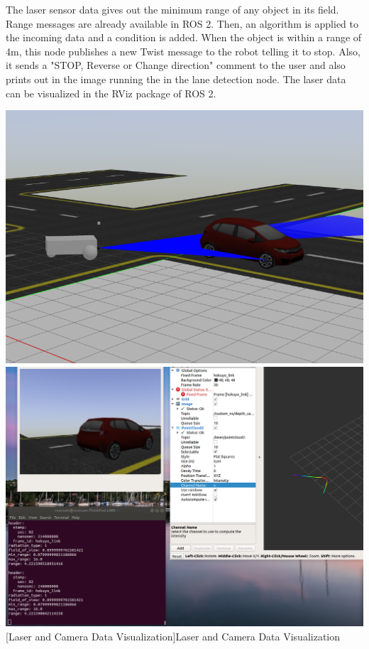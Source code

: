 \documentclass[%
xelatex,
	oneside,		%
	12pt,			%
	parskip=half,	%
	abstracton,
	chapterprefix=true%
    appendixprefix=true]
{scrbook}
\begin{document}
The laser sensor data gives out the minimum range of any object in its field. Range messages are already available in ROS 2. Then, an algorithm is applied to the incoming data and a condition is added. When the object is within a range of 4m, this node publishes a new Twist message to the robot telling it to stop. Also, it sends a "STOP, Reverse or Change direction" comment to the user and also prints out in the image running the in the lane detection node. The laser data can be visualized in the RViz package of ROS 2.
			\begin{center}
\includegraphics[scale=0.3]{fig/laser.png}
\includegraphics[scale=0.17]{fig/laser2.png}
[Laser and Camera Data Visualization]{Laser and Camera Data Visualization}
\label{fig:laser}
\end{center}
\end{document}
